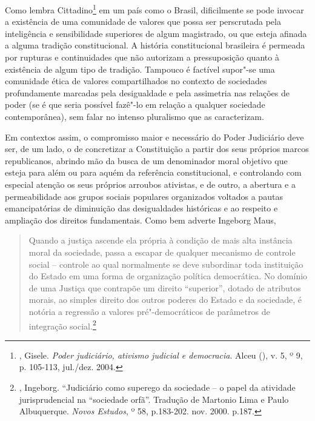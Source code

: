 Como lembra Cittadino\footnote{, Gisele. \emph{Poder
  judiciário, ativismo judicial e democracia}. Alceu (), v. 5, º
  9, p. 105-113, jul./dez. 2004.} em um país como o Brasil, dificilmente
se pode invocar a existência de uma comunidade de valores que possa ser
perscrutada pela inteligência e sensibilidade superiores de algum
magistrado, ou que esteja afinada a alguma tradição constitucional. A
história constitucional brasileira é permeada por rupturas e
continuidades que não autorizam a pressuposição quanto à existência de
algum tipo de tradição. Tampouco é factível supor"-se uma comunidade
ética de valores compartilhados no contexto de sociedades profundamente
marcadas pela desigualdade e pela assimetria nas relações de poder (se é
que seria possível fazê"-lo em relação a qualquer sociedade
contemporânea), sem falar no intenso pluralismo que as caracterizam.

Em contextos assim, o compromisso maior e necessário do Poder Judiciário
deve ser, de um lado, o de concretizar a Constituição a partir dos seus
próprios marcos republicanos, abrindo mão da busca de um denominador
moral objetivo que esteja para além ou para aquém da referência
constitucional, e controlando com especial atenção os seus próprios
arroubos ativistas, e de outro, a abertura e a permeabilidade aos grupos
sociais populares organizados voltados a pautas emancipatórias de
diminuição das desigualdades históricas e ao respeito e ampliação dos
direitos fundamentais. Como bem adverte Ingeborg Maus,

\begin{quote}
Quando a justiça ascende ela própria à condição de mais alta instância
moral da sociedade, passa a escapar de qualquer mecanismo de controle
social -- controle ao qual normalmente se deve subordinar toda
instituição do Estado em uma forma de organização política democrática.
No domínio de uma Justiça que contrapõe um direito ``superior'', dotado de
atributos morais, ao simples direito dos outros poderes do Estado e da
sociedade, é notória a regressão a valores pré"-democráticos de
parâmetros de integração social.\footnote{, Ingeborg. ``Judiciário
  como superego da sociedade -- o papel da atividade jurisprudencial na
  ``sociedade orfã''. Tradução de Martonio Lima e Paulo Albuquerque.
  \emph{Novos Estudos}, º 58, p.183-202. nov. 2000. p.187.}
\end{quote}

